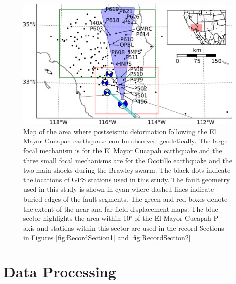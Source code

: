 \documentclass[review]{elsarticle}
\begin{document}
\begin{figure}
\includegraphics[scale=0.7]{Figures/ContextMap} 
\caption{Map of the area where postseismic deformation following the El Mayor-Cucapah earthquake can be observed geodetically. The large focal mechanism is for the El Mayor Cucapah earthquake and the three small focal mechanisms are for the Ocotillo earthquake and the two main shocks during the Brawley swarm. The black dots indicate the locations of GPS stations used in this study.  The fault geometry used in this study is shown in cyan where dashed lines indicate buried edges of the fault segments.  The green and red boxes denote the extent of the near and far-field displacement maps.  The blue sector highlights the area within 10$^\circ$ of the El Mayor-Cucapah P axis and stations within this sector are used in the record Sections in Figures \ref{fig:RecordSection1} and \ref{fig:RecordSection2}}       
\label{fig:ContextMap}
\end{figure}

\section{Data Processing}\label{sec:Data}
\end{document}

